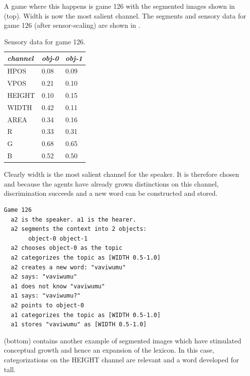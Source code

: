 A game where this happens is game 126 with the segmented images
shown in  (top). Width is now the most salient
channel. The segments and sensory data for game 126 
(after sensor-scaling) are shown in . 
\begin{table}
\begin{center}
\begin{tabular}{ l  l  l } \midrule
{\it channel}& {\it obj-0} & {\it obj-1}\\ \midrule
HPOS & 0.08 & 0.09\\ \midrule
VPOS & 0.21 & 0.10\\ \midrule
HEIGHT & 0.10 & 0.15\\ \midrule
WIDTH & 0.42 & 0.11\\ \midrule
AREA & 0.34 & 0.16\\ \midrule
R & 0.33 & 0.31\\ \midrule
G & 0.68 & 0.65\\ \midrule
B & 0.52 & 0.50\\ \midrule
\end{tabular}
\caption{ \label{tab:game126} Sensory data for game 126.}
\end{center}
\end{table}
Clearly width is the most salient channel for the speaker. 
It is therefore chosen and because the 
agents have already grown distinctions on this channel, 
discrimination succeeds and a new word can be
constructed and stored. 
\begin{verbatim}
Game 126 
  a2 is the speaker. a1 is the hearer. 
  a2 segments the context into 2 objects: 
       object-0 object-1
  a2 chooses object-0 as the topic 
  a2 categorizes the topic as [WIDTH 0.5-1.0]
  a2 creates a new word: "vaviwumu"
  a2 says: "vaviwumu"
  a1 does not know "vaviwumu"
  a1 says: "vaviwumu?"
  a2 points to object-0
  a1 categorizes the topic as [WIDTH 0.5-1.0]
  a1 stores "vaviwumu" as [WIDTH 0.5-1.0]
\end{verbatim}
 (bottom) contains another example
of segmented images which have stimulated conceptual
growth and hence an expansion of the lexicon. 
In this case, categorizations on the HEIGHT channel are
relevant and a word developed for tall.
